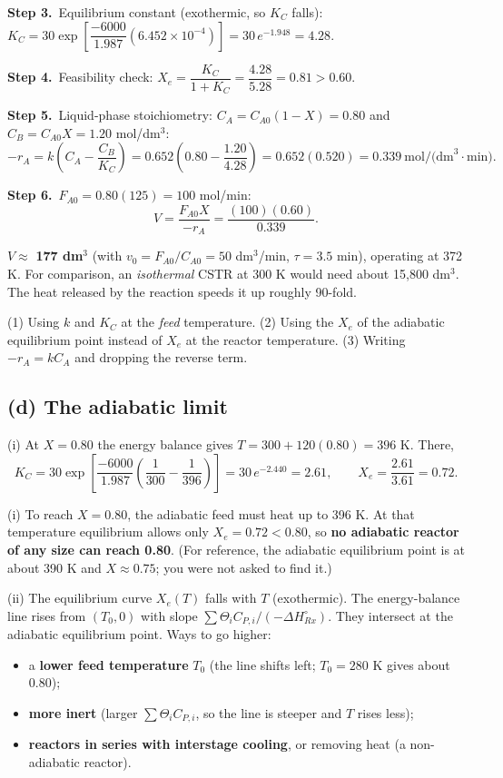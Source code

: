 \documentclass[11pt]{article}
\newcommand{\step}[1]{\par\smallskip\textbf{Step #1.}\ }
\begin{document}
\step{3}Equilibrium constant (exothermic, so $K_C$ falls):
$K_C=30\exp\!\left[\dfrac{-6000}{1.987}(6.452\times10^{-4})\right]=30\,e^{-1.948}=4.28$.

\step{4}Feasibility check: $X_e=\dfrac{K_C}{1+K_C}=\dfrac{4.28}{5.28}=0.81>0.60$. \checkmark

\step{5}Liquid-phase stoichiometry: $C_A=C_{A0}(1-X)=0.80$ and $C_B=C_{A0}X=1.20$ mol/dm$^3$:
\[
-r_A=k\left(C_A-\frac{C_B}{K_C}\right)=0.652\left(0.80-\frac{1.20}{4.28}\right)=0.652(0.520)=0.339\ \text{mol/(dm}^3\cdot\text{min)}.
\]
\step{6}$F_{A0}=0.80(125)=100$ mol/min:
\[
V=\frac{F_{A0}X}{-r_A}=\frac{(100)(0.60)}{0.339}.
\]
\begin{answer}
$V\approx$ \textbf{177 dm$^3$} (with $v_0=F_{A0}/C_{A0}=50$ dm$^3$/min, $\tau=3.5$ min), operating at 372 K.
For comparison, an \emph{isothermal} CSTR at 300 K would need about 15{,}800 dm$^3$. The heat released by the
reaction speeds it up roughly 90-fold.
\end{answer}
\begin{mistake}
(1) Using $k$ and $K_C$ at the \emph{feed} temperature. (2) Using the $X_e$ of the adiabatic equilibrium point instead of $X_e$
at the reactor temperature. (3) Writing $-r_A=kC_A$ and dropping the reverse term.
\end{mistake}

\subsection*{(d) The adiabatic limit}
(i) At $X=0.80$ the energy balance gives $T=300+120(0.80)=396$ K. There,
\[
K_C=30\exp\!\left[\frac{-6000}{1.987}\left(\frac{1}{300}-\frac{1}{396}\right)\right]=30\,e^{-2.440}=2.61,\qquad X_e=\frac{2.61}{3.61}=0.72 .
\]
\begin{answer}
(i) To reach $X=0.80$, the adiabatic feed must heat up to 396 K. At that temperature equilibrium allows only
$X_e=0.72<0.80$, so \textbf{no adiabatic reactor of any size can reach 0.80}. (For reference, the adiabatic equilibrium point
is at about 390 K and $X\approx0.75$; you were not asked to find it.)

(ii) The equilibrium curve $X_e(T)$ falls with $T$ (exothermic). The energy-balance line rises from $(T_0,0)$ with slope
$\sum\Theta_iC_{P,i}/(-\Delta H^\circ_{Rx})$. They intersect at the adiabatic equilibrium point. Ways to go higher:
\begin{itemize}[itemsep=1pt]
\item a \textbf{lower feed temperature} $T_0$ (the line shifts left; $T_0=280$ K gives about 0.80);
\item \textbf{more inert} (larger $\sum\Theta_iC_{P,i}$, so the line is steeper and $T$ rises less);
\item \textbf{reactors in series with interstage cooling}, or removing heat (a non-adiabatic reactor).
\end{itemize}
\end{answer}
\end{document}
